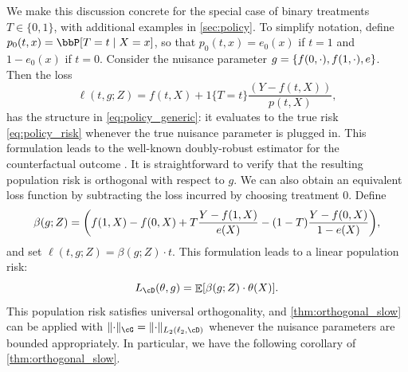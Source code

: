 \documentclass[11pt]{article} %
\newcommand{\preprint}[1]{\iftoggle{journal}{}{#1}}
\newcommand{\pref}[1]{\cref{#1}}
\theoremstyle{theorem}  %
\theoremstyle{plain}
\DeclarePairedDelimiter{\brk}{[}{]}
\DeclarePairedDelimiter{\crl}{\{}{\}}
\DeclarePairedDelimiter{\prn}{(}{)}
\DeclarePairedDelimiter{\nrm}{\|}{\|}
\DeclareMathOperator{\En}{\mathbb{E}}
\newcommand{\ls}{\ell}
\newcommand{\poprisk}{L_{\cD}}
\newcommand{\nuisance}{\cG}
\begin{document}
%
We make this discussion concrete for the special case of binary treatments $T\in \{0,1\}$, with additional examples in \pref{sec:policy}. To simplify notation, define $p_0(t, x) = \bbP\brk*{T=t \mid X=x}$, so that $p_0(t, x) = e_0(x)$ if $t=1$ and $1-e_0(x)$ if $t=0$. Consider the nuisance parameter $g=\crl*{f(0,\cdot),f(1,\cdot),e}$. Then the loss\preprint{ function}
\begin{equation}
\ell(t, g;Z) = f(t, X) + 1\{T=t\} \frac{(Y - f(t, X))}{p(t, X)},
\end{equation}
has the structure in \pref{eq:policy_generic}: it evaluates to the true risk \pref{eq:policy_risk} whenever the true nuisance parameter is plugged in. This formulation leads to the well-known doubly-robust estimator for the counterfactual outcome \citep{cassel1976some,robins1994estimation,robins1995semiparametric,dudik2011doubly}. It is straightforward to verify that the resulting population risk is orthogonal with respect to $g$. We can also obtain an equivalent loss function by subtracting the loss incurred by choosing treatment $0$. Define
\begin{equation}
\label{eq:binary_treatment}
\beta(g;Z)= \prn*{f(1, X) - f(0, X) + T\frac{Y - f(1, X)}{e(X)} - (1-T)\frac{Y - f(0, X)}{1-e(X)}},
\end{equation}
and set $\ell(t, g;Z) = \beta(g;Z)\cdot{}t$. This formulation leads to a linear population risk:
\begin{equation}
\poprisk(\theta, g) = \En\brk*{\beta(g;Z)\cdot \theta(X)}.
\end{equation}
This population risk satisfies universal orthogonality, and \pref{thm:orthogonal_slow} can be applied with $\nrm{\cdot}_{\nuisance}=\nrm{\cdot}_{L_2(\ls_2,\cD)}$ whenever the nuisance parameters are bounded appropriately. In particular, we have the following corollary of \pref{thm:orthogonal_slow}.
\end{document}
